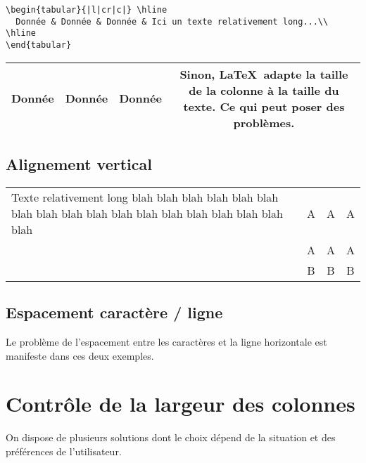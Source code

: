 \begin{boxedminipage}{\textwidth}
\begin{verbatim}
\begin{tabular}{|l|cr|c|} \hline
  Donnée & Donnée & Donnée & Ici un texte relativement long...\\ \hline
\end{tabular}
\end{verbatim}
\end{boxedminipage}

\begin{center}
  \begin{tabular}{|l|cr|c|} \hline
    Donnée & Donnée & Donnée & Sinon, \LaTeX\ adapte la taille de la colonne à la taille du texte. Ce qui peut poser des problèmes.\\ \hline
  \end{tabular}
\end{center}

\subsection{Alignement vertical}

\begin{tabular}{|p{}|ccc|} \hline
  Texte relativement long blah blah blah blah blah blah blah blah blah blah blah blah blah blah blah blah blah blah & A & A & A \tabularnewline \cline{2-4}
  & A & A & A \tabularnewline \cline{2-4}
  & B & B & B \tabularnewline \hline
\end{tabular}


\subsection{Espacement caractère / ligne}

Le problème de l'espacement entre les caractères et la ligne
horizontale est manifeste dans ces deux exemples.



\section{Contrôle de la largeur des colonnes}

\vfill

On dispose de plusieurs solutions dont le choix dépend de la
situation et des préférences de l'utilisateur.


